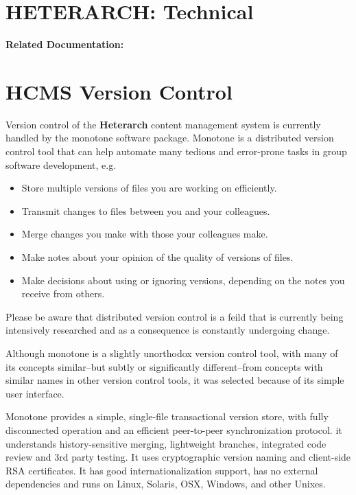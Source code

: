 \documentclass[12pt]{article}
\begin{document}
\section*{HETERARCH: Technical}

{\bf Related Documentation:}

\section*{HCMS Version Control}

Version control of the {\bf\small{Heterarch}} content management system is currently handled by the monotone software package. Monotone is a distributed version control tool that can help automate many tedious and error-prone tasks in group software development, e.g.
\begin{itemize}[noitemsep,nolistsep]
\item Store multiple versions of files you are working on efficiently.
\item Transmit changes to files between you and your colleagues.
\item Merge changes you make with those your colleagues make.
\item Make notes about your opinion of the quality of versions of files.
\item Make decisions about using or ignoring versions, depending on the notes you receive from others. 
\end{itemize}
Please be aware that distributed version control is a feild that is currently being intensively researched and as a consequence is constantly undergoing change.

Although monotone is a slightly unorthodox version control tool, with many of its concepts similar--but subtly or significantly different--from concepts with similar names in other version control tools, it was selected because of its simple user interface.

Monotone provides a simple, single-file transactional version store, with fully disconnected operation and an efficient peer-to-peer synchronization protocol. it understands history-sensitive merging, lightweight branches, integrated code review and 3rd party testing. It uses cryptographic version naming and client-side RSA certificates. It has good internationalization support, has no external dependencies and runs on Linux, Solaris, OSX, Windows, and other Unixes.
\end{document}
